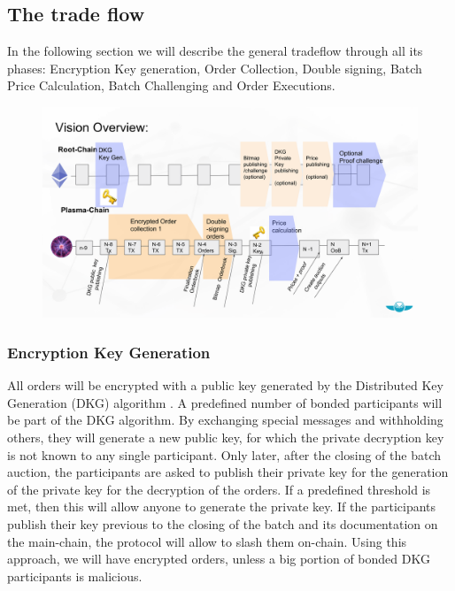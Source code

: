 \documentclass[11pt,parskip=full]{scrartcl}%
\begin{document}
\subsection{The trade flow}
\label{subsec:data}

In the following section we will describe the general tradeflow through all its phases: Encryption Key generation, Order Collection, Double signing, Batch Price Calculation, Batch Challenging and Order Executions.


\begin{figure}
\centering
\includegraphics[width=\textwidth]{overview_tradeflow.png}
\end{figure}



\subsubsection{Encryption Key Generation}
All orders will be encrypted with a public key generated by the Distributed Key Generation (DKG) algorithm \cite{DKG}. A predefined number of bonded participants will be part of the DKG algorithm.  By exchanging special messages and withholding others, they will generate a new public key, for which the private decryption key is not known to any single participant. Only later, after the closing of the batch auction, the participants are asked to publish their private key for the generation of the private key for the decryption of the orders. If a predefined threshold is met, then this will allow anyone to generate the private key. If the participants publish their key previous to the closing of the batch and its documentation on the main-chain, the protocol will allow to slash them on-chain. Using this approach, we will have encrypted orders, unless a big portion of bonded DKG participants is malicious.
\end{document}
